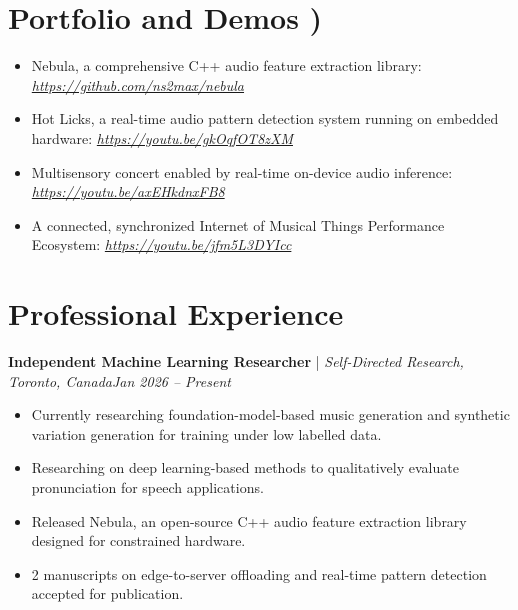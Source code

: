 \documentclass[11pt]{article}
\newenvironment{cvrole}[5]{%
  \par\noindent\textbf{\large #1} | \textit{\small #2, #3}\hfill \textit{\small #4 -- #5}\par
  \begin{itemize}[leftmargin=2em, itemsep=-0.3em, topsep=-0.5em]%
}{%
  \end{itemize}\par\noindent\mbox{}\par\vspace{0.1em}%
}
\begin{document}
\section*{Portfolio and Demos \footnotesize {)}}
\begin{itemize}[leftmargin=1.2em, itemsep=-0.25em]
    \item Nebula, a comprehensive C++ audio feature extraction library: \href{https://github.com/ns2max/nebula}{\textit{https://github.com/ns2max/nebula}}
    \item Hot Licks, a real-time audio pattern detection system running on embedded hardware: \href{https://youtu.be/gkOqfOT8zXM}{\textit{https://youtu.be/gkOqfOT8zXM}}
    \item Multisensory concert enabled by real-time on-device audio inference: \href{https://youtu.be/axEHkdnxFB8}{\textit{https://youtu.be/axEHkdnxFB8}}
    \item A connected, synchronized Internet of Musical Things Performance Ecosystem: \href{https://youtu.be/jfm5L3DYIcc}{\textit{https://youtu.be/jfm5L3DYIcc}}

\end{itemize}


\newpage
\section*{Professional Experience}

\begin{cvrole}{Independent Machine Learning Researcher}{Self-Directed Research}{Toronto, Canada}{Jan 2026}{Present}
    \item Currently researching foundation-model-based music generation and synthetic variation generation for training under low labelled data.
    \item Researching on deep learning-based methods to qualitatively evaluate pronunciation for speech applications.
    \item Released Nebula, an open-source C++ audio feature extraction library designed for constrained hardware.
    \item 2 manuscripts on edge-to-server offloading and real-time pattern detection accepted for publication.
\end{cvrole}
\end{document}

